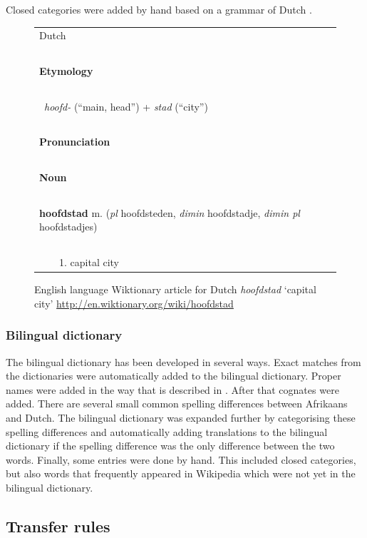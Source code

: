 \documentclass[11pt]{article}
\begin{document}
Closed categories were added by hand based on a grammar of Dutch \cite{Shetter:02}.

\begin{figure}
\centering
\begin{tiny}
\begin{tabular}{|l|}
\hline
{\large Dutch} \\
~\\
{\bf Etymology}\\
~\\
~{\em hoofd-} (``main, head'') + {\em stad} (``city'')\\
~\\
{\bf Pronunciation}\\
~\\
{\bf Noun}\\
~\\
{\bf hoofdstad} m. ({\em pl} hoofdsteden, {\em dimin} hoofdstadje, {\em dimin pl} hoofdstadjes) \\
~\\
~~~~1. capital city \\

\hline
\end{tabular}
\end{tiny}
\caption{English language Wiktionary article for Dutch \emph{hoofdstad} `capital city' 
    {\small \url{http://en.wiktionary.org/wiki/hoofdstad}}}
\label{fig:wikt1}
\end{figure}

\subsubsection{Bilingual dictionary}

The bilingual dictionary has been developed in several ways.
Exact matches from the dictionaries
were automatically added to the bilingual dictionary. Proper names were added in the
way that is described in . After that cognates were added. There are several
small common spelling differences between Afrikaans and Dutch. 
The bilingual dictionary was expanded further by categorising these spelling differences and
automatically adding translations to the bilingual dictionary if the spelling difference was the
only difference between the two words. Finally, some entries were done by hand.
This included closed categories, but also words that frequently appeared in Wikipedia
which were not yet in the bilingual dictionary.

\subsection{Transfer rules}
\end{document}
